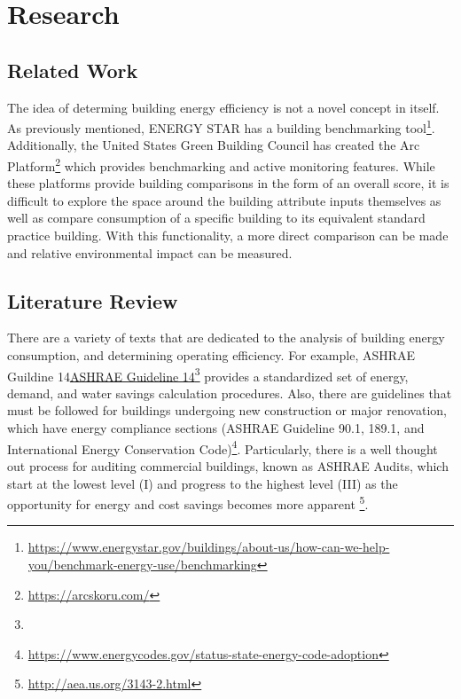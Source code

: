 \section*{Research}
\label{sec:literature_review}

\subsection{Related Work}
The idea of determing building energy efficiency is not a novel concept in itself.  As previously mentioned, ENERGY STAR has a building benchmarking tool\footnote{\href{https://www.energystar.gov/buildings/about-us/how-can-we-help-you/benchmark-energy-use/benchmarking }{\url{https://www.energystar.gov/buildings/about-us/how-can-we-help-you/benchmark-energy-use/benchmarking}}}.  Additionally, the United States Green Building Council has created the Arc Platform\footnote{\href{https://arcskoru.com/}{\url{https://arcskoru.com/}}} which provides benchmarking and active monitoring features.  While these platforms provide building comparisons in the form of an overall score, it is difficult to explore the space around the building attribute inputs themselves as well as compare consumption of a specific building to its equivalent standard practice building.  With this functionality, a more direct comparison can be made and relative environmental impact can be measured.

\subsection{Literature Review}

There are a variety of texts that are dedicated to the analysis of building energy consumption, and determining operating efficiency.  For example, ASHRAE Guildine 14\href{https://www.techstreet.com/standards/guideline-14-2014-measurement-of-energy-demand-and-water-savings?product_id=1888937}{ASHRAE Guideline 14}\footnote{} provides a standardized set of energy, demand, and water savings calculation procedures.  Also, there are guidelines that must be followed for buildings undergoing new construction or major renovation, which have energy compliance sections (ASHRAE Guideline 90.1, 189.1, and International Energy Conservation Code)\footnote{\href{https://www.energycodes.gov/status-state-energy-code-adoption}{\url{https://www.energycodes.gov/status-state-energy-code-adoption}}}.  Particularly, there is a well thought out process for auditing commercial buildings, known as ASHRAE Audits, which start at the lowest level (I) and progress to the highest level (III) as the opportunity for energy and cost savings becomes more apparent \footnote{\href{http://aea.us.org/3143-2.html}{\url{http://aea.us.org/3143-2.html}}}.  